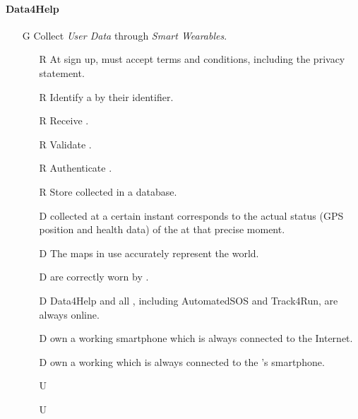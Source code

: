 \documentclass[../../rasd.tex]{subfiles}
\begin{document}
        \paragraph{Data4Help}
        \begin{itemize}

            \item[G\subs{1}]Collect \textit{User Data} through \textit{Smart Wearables}.
            \begin{itemize}
                \item[R\subs{4}]At sign up,  must accept terms and conditions, including the privacy statement.
                \item[R\subs{6}]Identify a  by their identifier.
                \item[R\subs{8}]Receive .
                \item[R\subs{9}]Validate .
                \item[R\subs{10}]Authenticate .
                \item[R\subs{11}]Store collected  in a database.
                \\
                \item[D\subs{2}] collected at a certain instant corresponds to the actual status (GPS position and health data) of the  at that precise moment.              
                \item[D\subs{3}]The maps in use accurately represent the world.
                \item[D\subs{8}] are correctly worn by .
                \item[D\subs{9}]Data4Help and all , including AutomatedSOS and Track4Run, are always online.
                \item[D\subs{10}] own a working smartphone which is always connected to the Internet.
                \item[D\subs{11}] own a working  which is always connected to the 's smartphone.
                \\
                \item[U\subs{1}] 
                \item[U\subs{3}]                      
            \end{itemize}


\end{itemize}
\end{document}
